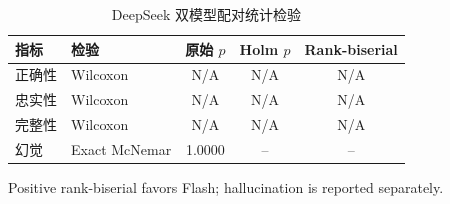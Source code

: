 \begin{table}[htbp]
\centering
\caption{DeepSeek 双模型配对统计检验}
\label{tab:deepseek-manual-significance}
\begin{tabular}{llccc}
\toprule
指标 & 检验 & 原始 $p$ & Holm $p$ & Rank-biserial \\
\midrule
正确性 & Wilcoxon & N/A & N/A & N/A \\
忠实性 & Wilcoxon & N/A & N/A & N/A \\
完整性 & Wilcoxon & N/A & N/A & N/A \\
幻觉 & Exact McNemar & 1.0000 & -- & -- \\
\bottomrule
\end{tabular}
\par\small Positive rank-biserial favors Flash; hallucination is reported separately.
\end{table}
